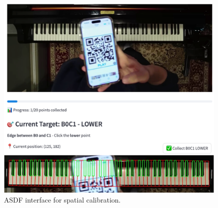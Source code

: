 \documentclass{article}
\begin{document}
\begin{figure}
    \centering
    \includegraphics[width=\linewidth]{Images/ASDF_keyboard.png}
    \caption{ASDF interface for spatial calibration.}
    \label{fig:asdfkeyboard}  
    \vspace{-5mm}
\end{figure}
\end{document}
